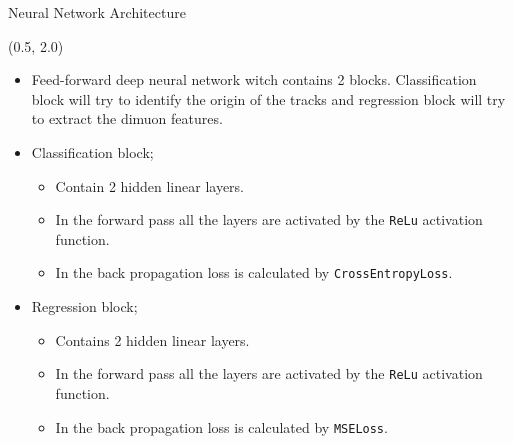 \documentclass[12pt, xcolor={dvipsnames}, aspectratio = 169, sans,mathserif]{beamer}
\begin{document}
\begin{frame}[fragile]{Neural Network Architecture}

\begin{textblock}{15.0}(0.5, 2.0)
\begin{itemize}

	\item Feed-forward deep neural network witch contains 2 blocks. Classification block will try to identify the origin of the tracks and regression block will try to extract the dimuon features.

	\item Classification block;

	\begin{itemize}

		\item Contain 2 hidden linear layers.

		\item In the forward pass all the layers are activated by the \verb|ReLu| activation function.

		\item In the back propagation loss is calculated by \verb|CrossEntropyLoss|.

	\end{itemize}

	\item Regression block;

	\begin{itemize}

		\item Contains 2 hidden linear layers.

		\item In the forward pass all the layers are activated by the \verb|ReLu| activation function.

		\item In the back propagation loss is calculated by \verb|MSELoss|.

	\end{itemize}

\end{itemize}
\end{textblock}

\end{frame}
\end{document}

